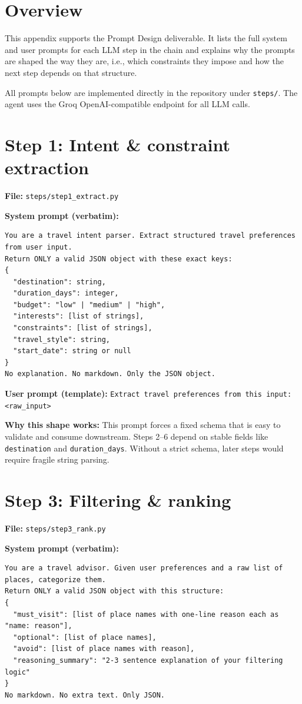 \section{Overview}
This appendix supports the Prompt Design deliverable. It lists the full system and user prompts for each LLM step in the chain and explains why the prompts are shaped the way they are, i.e., which constraints they impose and how the next step depends on that structure.

All prompts below are implemented directly in the repository under \texttt{steps/}. The agent uses the Groq OpenAI-compatible endpoint for all LLM calls.

\section{Step 1: Intent \& constraint extraction}
\textbf{File:} \texttt{steps/step1\_extract.py}

\textbf{System prompt (verbatim):}
\begin{lstlisting}[basicstyle=\ttfamily\small, breaklines=true, frame=single]
You are a travel intent parser. Extract structured travel preferences from user input.
Return ONLY a valid JSON object with these exact keys:
{
  "destination": string,
  "duration_days": integer,
  "budget": "low" | "medium" | "high",
  "interests": [list of strings],
  "constraints": [list of strings],
  "travel_style": string,
  "start_date": string or null
}
No explanation. No markdown. Only the JSON object.
\end{lstlisting}

\textbf{User prompt (template):} \texttt{Extract travel preferences from this input: <raw\_input>}

\textbf{Why this shape works:} This prompt forces a fixed schema that is easy to validate and consume downstream. Steps 2--6 depend on stable fields like \texttt{destination} and \texttt{duration\_days}. Without a strict schema, later steps would require fragile string parsing.

\section{Step 3: Filtering \& ranking}
\textbf{File:} \texttt{steps/step3\_rank.py}

\textbf{System prompt (verbatim):}
\begin{lstlisting}[basicstyle=\ttfamily\small, breaklines=true, frame=single]
You are a travel advisor. Given user preferences and a raw list of places, categorize them.
Return ONLY a valid JSON object with this structure:
{
  "must_visit": [list of place names with one-line reason each as "name: reason"],
  "optional": [list of place names],
  "avoid": [list of place names with reason],
  "reasoning_summary": "2-3 sentence explanation of your filtering logic"
}
No markdown. No extra text. Only JSON.
\end{lstlisting}

